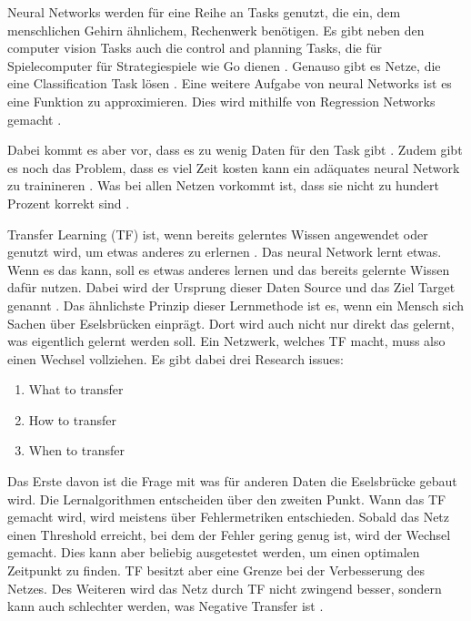 Neural Networks werden für eine Reihe an Tasks genutzt, die ein, dem menschlichen Gehirn ähnlichem, Rechenwerk benötigen. 
Es gibt neben den computer vision Tasks auch die control and planning Tasks, die für Spielecomputer für Strategiespiele wie Go dienen \cite{deep_neural_networks_scientific_models}.
Genauso gibt es Netze, die eine Classification Task lösen \cite{handwritten_digit}. 
Eine weitere Aufgabe von neural Networks ist es eine Funktion zu approximieren. Dies 
wird mithilfe von Regression Networks gemacht \cite{Gen_Reg}.      

Dabei kommt es aber vor, dass es zu wenig Daten für den Task gibt \cite{survey_transfer}. 
Zudem gibt es noch das Problem, dass es viel Zeit kosten kann ein adäquates 
neural Network zu trainineren \cite{cascor}. 
Was bei allen Netzen vorkommt ist, dass sie nicht zu hundert Prozent korrekt sind \cite{EvoClassAndReg}.

Transfer Learning (TF) ist, wenn bereits gelerntes Wissen angewendet oder genutzt wird, um etwas anderes zu erlernen \cite{transfer_learning}. 
Das neural Network lernt etwas. Wenn es das kann, soll es etwas anderes lernen und das bereits gelernte Wissen dafür nutzen. 
Dabei wird der Ursprung dieser Daten Source und das Ziel Target genannt \cite{phd_deep_cascade}. 
Das ähnlichste Prinzip dieser Lernmethode ist es, wenn ein Mensch sich Sachen über Eselsbrücken 
einprägt. Dort wird auch nicht nur direkt das gelernt, was eigentlich gelernt werden soll. 
Ein Netzwerk, welches TF macht, muss also einen Wechsel vollziehen. 
Es gibt dabei drei Research issues: 
\begin{enumerate}
    \item What to transfer
    \item How to transfer
    \item When to transfer
\end{enumerate}
\cite{survey_transfer}
Das Erste davon ist die Frage mit was für anderen Daten die Eselsbrücke gebaut wird. 
Die Lernalgorithmen entscheiden über den zweiten Punkt. Wann das TF 
gemacht wird, wird meistens über Fehlermetriken entschieden. Sobald das Netz einen Threshold erreicht, 
bei dem der Fehler gering genug ist, wird der Wechsel gemacht. Dies kann aber beliebig 
ausgetestet werden, um einen optimalen Zeitpunkt zu finden. 
TF besitzt aber eine Grenze bei der Verbesserung des Netzes. Des Weiteren wird das Netz durch TF nicht zwingend besser, 
sondern kann auch schlechter werden, was Negative Transfer ist \cite{survey_transfer}. 

